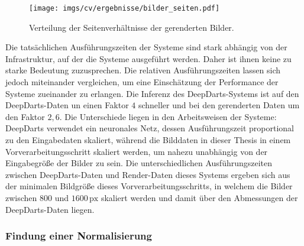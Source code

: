 \begin{figure}
    \centering
    \texttt{[image: imgs/cv/ergebnisse/bilder\_seiten.pdf]}
    \caption{Verteilung der Seitenverhältnisse der gerenderten Bilder.}
    \label{img:cv_render_seiten}
\end{figure}

Die tatsächlichen Ausführungszeiten der Systeme sind stark abhängig von der Infrastruktur, auf der die Systeme ausgeführt werden. Daher ist ihnen keine zu starke Bedeutung zuzusprechen. Die relativen Ausführungszeiten lassen sich jedoch miteinander vergleichen, um eine Einschätzung der Performance der Systeme zueinander zu erlangen. Die Inferenz des DeepDarts-Systems ist auf den DeepDarts-Daten un einen Faktor $4$ schneller und bei den gerenderten Daten um den Faktor $2,6$. Die Unterschiede liegen in den Arbeitsweisen der Systeme: DeepDarts verwendet ein neuronales Netz, dessen Ausführungszeit proportional zu den Eingabedaten skaliert, während die Bilddaten in dieser Thesis in einem Vorverarbeitungsschritt skaliert werden, um nahezu unabhängig von der Eingabegröße der Bilder zu sein. Die unterschiedlichen Ausführungszeiten zwischen DeepDarts-Daten und Render-Daten dieses Systems ergeben sich aus der minimalen Bildgröße dieses Vorverarbeitungsschritts, in welchem die Bilder zwischen $800$ und $1600\,\text{px}$ skaliert werden und damit über den Abmessungen der DeepDarts-Daten liegen.

\subsubsection{Findung einer Normalisierung} %

\CVNorm

